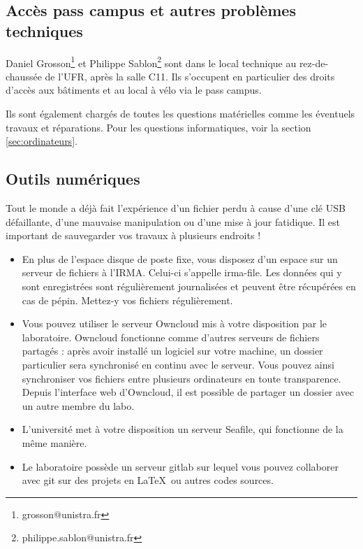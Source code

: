 \documentclass[a5paper]{article}
\begin{document}
\subsection{Accès pass campus et autres problèmes techniques}
\label{subsec:technique}

Daniel Grosson\footnote{grosson@unistra.fr} et Philippe
Sablon\footnote{philippe.sablon@unistra.fr} sont dans le local
technique au rez-de-chaussée de l'UFR, après la salle C11. Ils s'occupent en particulier des droits d'accès aux bâtiments et au local à vélo via le pass campus.


Ils sont également chargés de toutes les questions matérielles comme
les éventuels travaux et réparations. Pour les questions
informatiques, voir la section \ref{sec:ordinateurs}.

\subsection{Outils numériques}
\label{sec:outils-numeriques}
Tout le monde a déjà fait l'expérience d'un fichier perdu à cause
d'une clé USB défaillante, d'une mauvaise manipulation ou d'une mise à
jour fatidique. Il est important de sauvegarder vos travaux à
plusieurs endroits !

\begin{itemize}
\item En plus de l'espace disque de poste fixe, vous disposez d'un
  espace sur un serveur de fichiers à l'IRMA. Celui-ci s'appelle
  irma-file. Les données qui y sont enregistrées sont régulièrement
  journalisées et peuvent être récupérées en cas de pépin. Mettez-y
  vos fichiers régulièrement.
\item Vous
  pouvez utiliser le serveur Owncloud mis à votre
  disposition par le laboratoire. Owncloud fonctionne comme d'autres serveurs de fichiers
  partagés : après avoir installé un logiciel sur votre machine, un
  dossier particulier sera synchronisé en continu avec le
  serveur. Vous pouvez ainsi synchroniser vos fichiers entre plusieurs
  ordinateurs en toute transparence. Depuis l'interface web d'Owncloud, il est possible de
  partager un dossier avec un autre membre du labo.
\item L'université met à votre disposition un serveur Seafile, qui
  fonctionne de la même manière.
\item Le laboratoire possède un
  serveur gitlab sur lequel vous pouvez collaborer avec git sur des
  projets en \LaTeX~ou autres codes sources.
\end{itemize}
\end{document}
